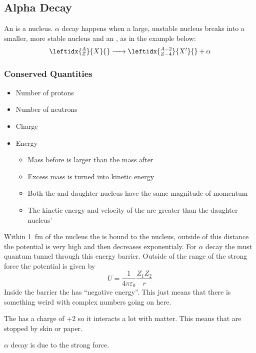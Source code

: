 \section{}

\subsection*{Alpha Decay}

An \aparticle is a  nucleus. \(\alpha\) decay happens when a large, unstable nucleus breaks into a smaller, more stable nucleus and an \aparticle, as in the example below:
\[\leftidx{_Z^A}{X}{}\ce{->}\leftidx{_{Z-4}^{A-2}}{X'}{}+\alpha\]
\subsubsection*{Conserved Quantities}
\begin{itemize}
\item Number of protons
\item Number of neutrons
\item Charge
\item Energy
\begin{itemize}
\item Mass before is larger than the mass after
\item Excess mass is turned into kinetic energy
\item Both the \aparticle and daughter nucleus have the same magnitude of momentum
\item The kinetic energy and velocity of the \aparticle are greater than the daughter nucleus'
\end{itemize}
\end{itemize}

Within \SI{1}{fm} of the nucleus the \aparticle is bound to the nucleus, outside of this distance the potential is very high and then decreases exponentialy. For \(\alpha\) decay the \aparticle must quantum tunnel through this energy barrier. Outside of the range of the strong force the potential is given by
\[U=\frac{1}{4\pi\varepsilon_0}\frac{Z_1Z_2}{r}\]
 Inside the barrier the \aparticle has ``negative energy''. This just means that there is something weird with complex numbers going on here.
 
The \aparticle has a charge of +2 so it interacts a lot with matter. This means that \aparticles are stopped by skin or paper.

\(\alpha\) decay is due to the strong force.

